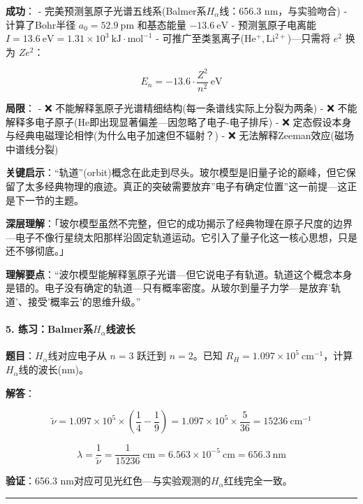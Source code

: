 \textbf{成功}：
- 完美预测氢原子光谱五线系(Balmer系\(H_\alpha\)线：656.3 nm，与实验吻合)
- 计算了Bohr半径 \(a_0 = 52.9\ \mathrm{pm}\) 和基态能量 \(-13.6\ \mathrm{eV}\)
- 预测氢原子电离能 \(I = 13.6\ \mathrm{eV} = 1.31 \times 10^3\ \mathrm{kJ\cdot mol^{-1}}\)
- 可推广至类氢离子(\(\mathrm{He^+, Li^{2+}}\))---只需将 \(e^2\) 换为 \(Ze^2\)：

\[E_n = -13.6 \cdot \frac{Z^2}{n^2}\ \mathrm{eV}\]

\textbf{局限}：
- ❌ 不能解释氢原子光谱精细结构(每一条谱线实际上分裂为两条)
- ❌ 不能解释多电子原子(He即出现显著偏差---因忽略了电子-电子排斥)
- ❌ 定态假设本身与经典电磁理论相悖(为什么电子加速但不辐射？)
- ❌ 无法解释Zeeman效应(磁场中谱线分裂)

\textbf{关键启示}：``轨道''(orbit)概念在此走到尽头。玻尔模型是旧量子论的巅峰，但它保留了太多经典物理的痕迹。真正的突破需要放弃''电子有确定位置''这一前提---这正是下一节的主题。

\textbf{深层理解}：「玻尔模型虽然不完整，但它的成功揭示了经典物理在原子尺度的边界---电子不像行星绕太阳那样沿固定轨道运动。它引入了量子化这一核心思想，只是还不够彻底。」

\textbf{理解要点}：``波尔模型能解释氢原子光谱---但它说电子有轨道。轨道这个概念本身是错的。电子没有确定的轨道---只有概率密度。从玻尔到量子力学---是放弃'轨道'、接受'概率云'的思维升级。''

\paragraph{\texorpdfstring{5. 练习：Balmer系\(H_\alpha\)线波长}{5. 练习：Balmer系H\_\textbackslash alpha线波长}}\label{ux7ec3ux4e60balmerux7cfbh_alphaux7ebfux6ce2ux957f}

\textbf{题目}：\(H_\alpha\)线对应电子从 \(n=3\) 跃迁到 \(n=2\)。已知 \(R_H = 1.097 \times 10^5\ \mathrm{cm^{-1}}\)，计算\(H_\alpha\)线的波长(nm)。

\textbf{解答}：

\[
\tilde{\nu} = 1.097\times 10^5 \times \left(\frac{1}{4} - \frac{1}{9}\right) = 1.097\times 10^5 \times \frac{5}{36} = 15236\ \mathrm{cm^{-1}}
\]

\[
\lambda = \frac{1}{\tilde{\nu}} = \frac{1}{15236}\ \mathrm{cm} = 6.563\times 10^{-5}\ \mathrm{cm} = 656.3\ \mathrm{nm}
\]

\textbf{验证}：656.3 nm对应可见光红色---与实验观测的\(H_\alpha\)红线完全一致。

\begin{center}\rule{0.5\linewidth}{0.5pt}\end{center}

